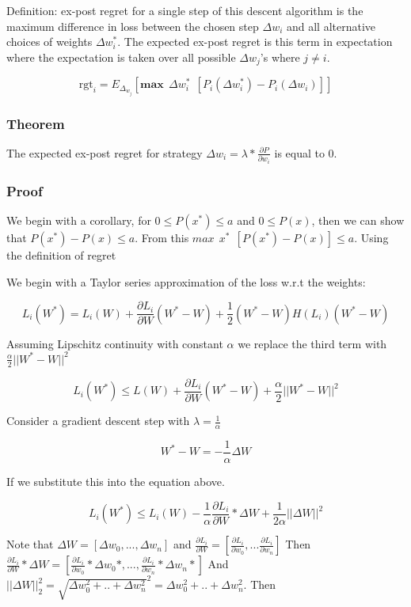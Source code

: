 \documentclass{article}
\begin{document}
Definition: ex-post regret for a single step of this descent algorithm is the maximum difference in loss between the chosen step $\Delta w_i$ and all alternative choices of weights $\Delta w_i^*$. The expected ex-post regret is this term in expectation where the expectation is taken over all possible $\Delta w_j$'s where $j \neq i$.

\[ \textrm{rgt}_i = E_\Delta_w_j [ \textbf{max} \ \ \Delta w_i^* \ \ [P_i(\Delta w_i^*) - P_i(\Delta w_i)] ] \]

\subsubsection{Theorem}

The expected ex-post regret for strategy $\Delta w_i = \lambda * \frac{\partial P}{\partial w_i}$ is equal to 0.

\subsubsection{Proof}

We begin with a corollary, for $0 \leq P(x^*) \leq a$ and $0 \leq P(x)$, then we can show that $P(x^*) - P(x) \leq a$. From this $ max \ \ x^* \ \ [ P(x^*) - P(x) ] \leq a$. Using the definition of regret 

We begin with a Taylor series approximation of the loss w.r.t the weights:

\[L_i(W^*) = L_i(W) +  \frac{\partial L_i}{\partial W} (W^* - W) + \frac{1}{2}(W^* - W) H(L_i) (W^* - W) \]

Assuming Lipschitz continuity with constant $\alpha$ we replace the third term with $\frac{\alpha}{2} ||W^* - W||^2$

\[L_i(W^*) \leq L(W) + \frac{\partial L_i}{\partial W} (W^* - W) + \frac{\alpha}{2} ||W^* - W||^2 \]

Consider a gradient descent step with $\lambda = \frac{1}{\alpha}$

\[W^* - W  =  -\frac{1}{\alpha} \Delta W \] 

If we substitute this into the equation above.

\[ L_i(W^*) \leq L_i(W) - \frac{1}{\alpha} \frac{\partial L_i}{\partial W} * \Delta W + \frac{1}{2\alpha} || \Delta W ||^2 \]

Note that $\Delta W = [\Delta w_0, ... , \Delta w_n]$ and $\frac{\partial L_i}{\partial W} = [\frac{\partial L_i}{\partial w_0}, ... \frac{\partial L_i}{\partial w_n}]$ Then $\frac{\partial L_i}{\partial W} * \Delta W = [\frac{\partial L_i}{\partial w_0} * \Delta w_0 *, ... , \frac{\partial L_i}{\partial w_n} * \Delta w_n *]$ And $||\Delta W ||_2^2 = \sqrt{\Delta w_0^2 + .. + \Delta w_n^2}^2 = \Delta w_0^2 + .. + \Delta w_n^2$. Then
\end{document}
